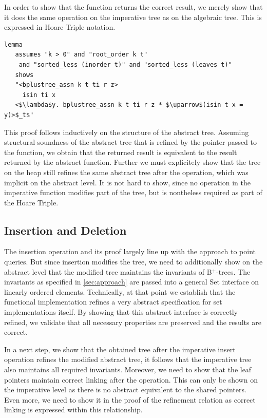 \documentclass[a4paper,UKenglish,cleveref, autoref, thm-restate]{lipics-v2021}
\newcommand{\btrees}{B$^+$-trees}
\begin{document}
In order to show that the function returns the correct result,
we merely show that it does the same operation on the imperative tree
as on the algebraic tree.
This is expressed in Hoare Triple notation.

\begin{lstlisting}[mathescape=true, language=Isabelle,label=lst:isin-refines]
lemma  
   assumes "k > 0" and "root_order k t"
    and "sorted_less (inorder t)" and "sorted_less (leaves t)"
   shows
   "<bplustree_assn k t ti r z>
     isin ti x
   <$\lambda$y. bplustree_assn k t ti r z * $\uparrow$(isin t x = y)>$_t$"
\end{lstlisting}

This proof follows inductively on the structure of the abstract tree.
Assuming structural soundness of the abstract tree that is refined by the pointer passed to the function,
we obtain that the returned result is equivalent to the result returned by the abstract function.
Further we must explicitely show that the tree on the heap
still refines the same abstract tree after the operation,
which was implicit on the abstract level.
It is not hard to show, since no operation in the imperative
function modifies part of the tree,
but is nontheless required as part of the Hoare Triple.

\subsection{Insertion and Deletion}
\label{sec:insert_delete}

The insertion operation and its proof largely line up with the approach to point queries.
But since insertion modifies the tree,
we need to additionally show on the abstract level that the modified tree
maintains the invariants of \btrees.
The invariants as specified in \autoref{sec:approach}
are passed into a general Set interface on
linearly ordered elements.
Technically, at that point we establish that the functional
implementation refines a very abstract specification
for set implementations itself. 
By showing that this abstract interface is correctly
refined, we validate that all necessary
properties are preserved and the results are correct.


In a next step, we show that the obtained tree
after the imperative insert operation
refines the modified abstract tree, it follows that the imperative tree
also maintains all required invariants.
Moreover, we need to show that the leaf pointers
maintain correct linking after the operation.
This can only be shown on the imperative level as there is no abstract equivalent
to the shared pointers.
Even more, we need to show it in the proof
of the refinement relation as correct linking
is expressed within this relationship.
\end{document}

